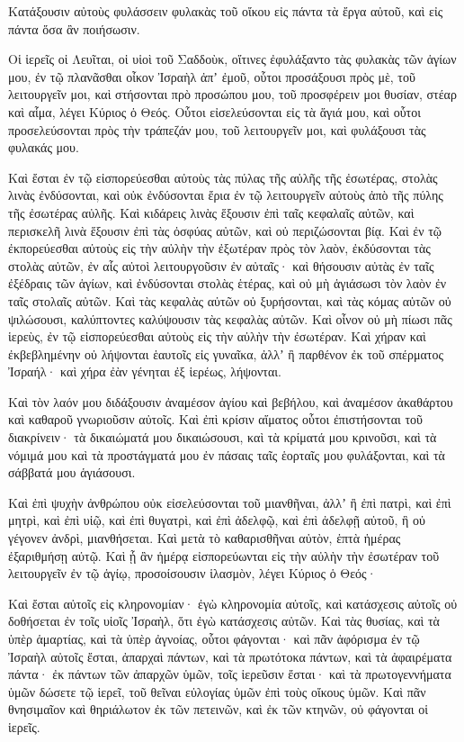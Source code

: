 {Κατάξουσιν αὐτοὺς φυλάσσειν φυλακὰς τοῦ οἴκου εἰς πάντα τὰ ἔργα αὐτοῦ, καὶ εἰς πάντα ὅσα ἂν ποιήσωσιν.
\par }{\PP {}Οἱ ἱερεῖς οἱ Λευῖται, οἱ υἱοὶ τοῦ Σαδδοὺκ, οἵτινες ἐφυλάξαντο τὰς φυλακὰς τῶν ἁγίων μου, ἐν τῷ πλανᾶσθαι οἶκον Ἰσραὴλ ἀπʼ ἐμοῦ, οὗτοι προσάξουσι πρὸς μὲ, τοῦ λειτουργεῖν μοι, καὶ στήσονται πρὸ προσώπου μου, τοῦ προσφέρειν μοι θυσίαν, στέαρ καὶ αἷμα, λέγει Κύριος ὁ Θεός.
Οὗτοι εἰσελεύσονται εἰς τὰ ἅγιά μου, καὶ οὗτοι προσελεύσονται πρὸς τὴν τράπεζάν μου, τοῦ λειτουργεῖν μοι, καὶ φυλάξουσι τὰς φυλακάς μου.
\par }{\PP {}Καὶ ἔσται ἐν τῷ εἰσπορεύεσθαι αὐτοὺς τὰς πύλας τῆς αὐλῆς τῆς ἐσωτέρας, στολὰς λινὰς ἐνδύσονται, καὶ οὐκ ἐνδύσονται ἔρια ἐν τῷ λειτουργεῖν αὐτοὺς ἀπὸ τῆς πύλης τῆς ἐσωτέρας αὐλῆς.
Καὶ κιδάρεις λινὰς ἕξουσιν ἐπὶ ταῖς κεφαλαῖς αὐτῶν, καὶ περισκελῆ λινὰ ἕξουσιν ἐπὶ τὰς ὀσφύας αὐτῶν, καὶ οὐ περιζώσονται βίᾳ.
Καὶ ἐν τῷ ἐκπορεύεσθαι αὐτοὺς εἰς τὴν αὐλὴν τὴν ἐξωτέραν πρὸς τὸν λαὸν, ἐκδύσονται τὰς στολὰς αὐτῶν, ἐν αἷς αὐτοὶ λειτουργοῦσιν ἐν αὐταῖς· καὶ θήσουσιν αὐτὰς ἐν ταῖς ἐξέδραις τῶν ἁγίων, καὶ ἐνδύσονται στολὰς ἑτέρας, καὶ οὐ μὴ ἁγιάσωσι τὸν λαὸν ἐν ταῖς στολαῖς αὐτῶν.
Καὶ τὰς κεφαλὰς αὐτῶν οὐ ξυρήσονται, καὶ τὰς κόμας αὐτῶν οὐ ψιλώσουσι, καλύπτοντες καλύψουσιν τὰς κεφαλὰς αὐτῶν.
Καὶ οἶνον οὐ μὴ πίωσι πᾶς ἱερεὺς, ἐν τῷ εἰσπορεύεσθαι αὐτοὺς εἰς τὴν αὐλὴν τὴν ἐσωτέραν.
Καὶ χήραν καὶ ἐκβεβλημένην οὐ λήψονται ἑαυτοῖς εἰς γυναῖκα, ἀλλʼ ἢ παρθένον ἐκ τοῦ σπέρματος Ἰσραήλ· καὶ χήρα ἐὰν γένηται ἐξ ἱερέως, λήψονται.
\par }{\PP {}Καὶ τὸν λαόν μου διδάξουσιν ἀναμέσον ἁγίου καὶ βεβήλου, καὶ ἀναμέσον ἀκαθάρτου καὶ καθαροῦ γνωριοῦσιν αὐτοῖς.
Καὶ ἐπὶ κρίσιν αἵματος οὗτοι ἐπιστήσονται τοῦ διακρίνειν· τὰ δικαιώματά μου δικαιώσουσι, καὶ τὰ κρίματά μου κρινοῦσι, καὶ τὰ νόμιμά μου καὶ τὰ προστάγματά μου ἐν πάσαις ταῖς ἑορταῖς μου φυλάξονται, καὶ τὰ σάββατά μου ἁγιάσουσι.
\par }{\PP {}Καὶ ἐπὶ ψυχὴν ἀνθρώπου οὐκ εἰσελεύσονται τοῦ μιανθῆναι, ἀλλʼ ἢ ἐπὶ πατρὶ, καὶ ἐπὶ μητρὶ, καὶ ἐπὶ υἱῷ, καὶ ἐπὶ θυγατρὶ, καὶ ἐπὶ ἀδελφῷ, καὶ ἐπὶ ἀδελφῇ αὐτοῦ, ἣ οὐ γέγονεν ἀνδρὶ, μιανθήσεται.
Καὶ μετὰ τὸ καθαρισθῆναι αὐτὸν, ἑπτὰ ἡμέρας ἐξαριθμήσῃ αὐτῷ.
Καὶ ᾗ ἂν ἡμέρᾳ εἰσπορεύωνται εἰς τὴν αὐλὴν τὴν ἐσωτέραν τοῦ λειτουργεῖν ἐν τῷ ἁγίῳ, προσοίσουσιν ἱλασμὸν, λέγει Κύριος ὁ Θεός·
\par }{\PP {}Καὶ ἔσται αὐτοῖς εἰς κληρονομίαν· ἐγὼ κληρονομία αὐτοῖς, καὶ κατάσχεσις αὐτοῖς οὐ δοθήσεται ἐν τοῖς υἱοῖς Ἰσραὴλ, ὅτι ἐγὼ κατάσχεσις αὐτῶν.
Καὶ τὰς θυσίας, καὶ τὰ ὑπὲρ ἁμαρτίας, καὶ τὰ ὑπὲρ ἀγνοίας, οὗτοι φάγονται· καὶ πᾶν ἀφόρισμα ἐν τῷ Ἰσραὴλ αὐτοῖς ἔσται,
ἀπαρχαὶ πάντων, καὶ τὰ πρωτότοκα πάντων, καὶ τὰ ἀφαιρέματα πάντα· ἐκ πάντων τῶν ἀπαρχῶν ὑμῶν, τοῖς ἱερεῦσιν ἔσται· καὶ τὰ πρωτογεννήματα ὑμῶν δώσετε τῷ ἱερεῖ, τοῦ θεῖναι εὐλογίας ὑμῶν ἐπὶ τοὺς οἴκους ὑμῶν.
Καὶ πᾶν θνησιμαῖον καὶ θηριάλωτον ἐκ τῶν πετεινῶν, καὶ ἐκ τῶν κτηνῶν, οὐ φάγονται οἱ ἱερεῖς.

}
